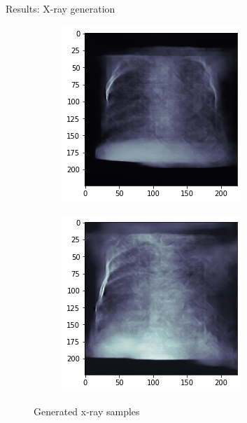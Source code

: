 \begin{frame}{Results: X-ray generation}
\begin{figure}[htbp!]
\begin{subfigure}[b]{0.3\textwidth}
     \end{subfigure} 
     \hfill
     \begin{subfigure}[b]{0.3\textwidth}
         \centering
         \includegraphics[width=\textwidth]{Images/xray_sample5.png}
     \end{subfigure}
     \hfill
     \begin{subfigure}[b]{0.3\textwidth}
         \centering
         \includegraphics[width=\textwidth]{Images/xray_sample6.png}
     \end{subfigure}
     \caption{Generated x-ray samples}
\end{figure}
\end{frame}

